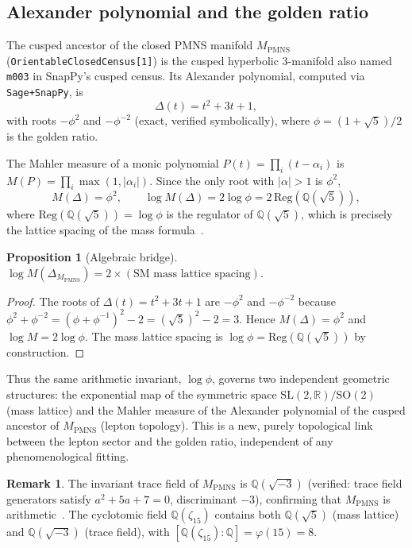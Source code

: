 ﻿\documentclass[12pt]{article}
\newtheorem{proposition}[theorem]{Proposition}
\theoremstyle{definition}
\newtheorem{remark}[theorem]{Remark}
\begin{document}
\subsection{Alexander polynomial and the golden ratio}
\label{subsec:alexander}

The cusped ancestor of the closed PMNS manifold $M_\text{PMNS}$
(\texttt{OrientableClosedCensus[1]}) is the cusped hyperbolic 3-manifold
also named \texttt{m003} in SnapPy's cusped census.  Its Alexander
polynomial, computed via \texttt{Sage+SnapPy}, is
\[
\Delta(t) = t^2 + 3t + 1,
\]
with roots $-\phi^2$ and $-\phi^{-2}$ (exact, verified symbolically),
where $\phi = (1+\sqrt5)/2$ is the golden ratio.

The Mahler measure of a monic polynomial $P(t)=\prod_i(t-\alpha_i)$ is
$M(P)=\prod_i\max(1,|\alpha_i|)$.  Since the only root with $|\alpha|>1$
is $\phi^2$,
\[
M(\Delta) = \phi^2, \qquad
\log M(\Delta) = 2\log\phi = 2\,\mathrm{Reg}(\mathbb{Q}(\sqrt{5})),
\]
where $\mathrm{Reg}(\mathbb{Q}(\sqrt{5}))=\log\phi$ is the regulator of
$\mathbb{Q}(\sqrt{5})$, which is precisely the lattice spacing of the
mass formula~\cite{Gentry:ShapeSpace}.

\begin{proposition}[Algebraic bridge]
\label{prop:mahler}
$\log M(\Delta_{M_\text{PMNS}}) = 2 \times (\text{SM mass lattice spacing})$.
\end{proposition}

\begin{proof}
The roots of $\Delta(t)=t^2+3t+1$ are $-\phi^2$ and $-\phi^{-2}$ because
$\phi^2+\phi^{-2}=(\phi+\phi^{-1})^2-2=(\sqrt{5})^2-2=3$.
Hence $M(\Delta)=\phi^2$ and $\log M = 2\log\phi$.  The mass lattice
spacing is $\log\phi = \mathrm{Reg}(\mathbb{Q}(\sqrt{5}))$ by construction.
\end{proof}

Thus the same arithmetic invariant, $\log\phi$, governs two independent
geometric structures: the exponential map of the symmetric space
$\mathrm{SL}(2,\mathbb{R})/\mathrm{SO}(2)$ (mass lattice) and the
Mahler measure of the Alexander polynomial of the cusped ancestor of
$M_\text{PMNS}$ (lepton topology).  This is a new, purely topological
link between the lepton sector and the golden ratio, independent of any
phenomenological fitting.

\begin{remark}
The invariant trace field of $M_\text{PMNS}$ is $\mathbb{Q}(\sqrt{-3})$
(verified: trace field generators satisfy $a^2+5a+7=0$, discriminant
$-3$), confirming that $M_\text{PMNS}$ is arithmetic~\cite{Chinburg98}.
The cyclotomic field $\mathbb{Q}(\zeta_{15})$ contains both
$\mathbb{Q}(\sqrt{5})$ (mass lattice) and $\mathbb{Q}(\sqrt{-3})$
(trace field), with $[\mathbb{Q}(\zeta_{15}):\mathbb{Q}]=\varphi(15)=8$.
\end{remark}
\end{document}
